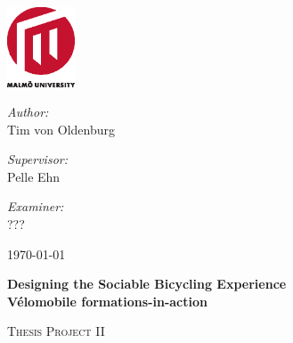 \begin{titlepage}


\begin{center}

\AddToShipoutPicture*{\BackgroundPic}

\includegraphics[width=0.15\textwidth]{mah2.eps}~\\[1cm]

\vspace*{1.5cm}

\begin{minipage}{0.43\textwidth}
\begin{flushleft} \large
\emph{Author:}\\
Tim von Oldenburg
\end{flushleft}
\end{minipage}
\begin{minipage}{0.43\textwidth}
\begin{flushright} \large
\emph{Supervisor:} \\
Pelle Ehn
\end{flushright}
\end{minipage}

\vspace*{0.4cm}

\begin{minipage}{0.86\textwidth}
\begin{flushright} \large
\emph{Examiner:} \\
???
\end{flushright}
\end{minipage}

\vspace*{3.5cm}

{\large \today}

\vfill
\begin{minipage}{0.86\textwidth}
\begin{flushleft} \large

\vspace*{0.4cm}
\begin{spacing}{1.0}
{ \huge \bfseries Designing the Sociable Bicycling Experience\\[0.4cm]\large{Vélomobile formations-in-action}}
\end{spacing}
\vspace*{1.5cm}
\textsc{\Large Thesis Project II}
\end{flushleft}
\end{minipage}




\end{center}
\end{titlepage}
